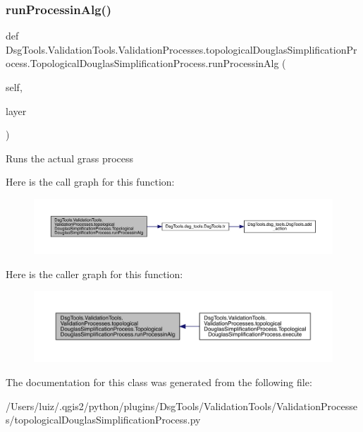 \subsubsection{\texorpdfstring{run\+Processin\+Alg()}{runProcessinAlg()}}
{\footnotesize\ttfamily def Dsg\+Tools.\+Validation\+Tools.\+Validation\+Processes.\+topological\+Douglas\+Simplification\+Process.\+Topological\+Douglas\+Simplification\+Process.\+run\+Processin\+Alg (\begin{DoxyParamCaption}\item[{}]{self,  }\item[{}]{layer }\end{DoxyParamCaption})}

\begin{DoxyVerb}Runs the actual grass process
\end{DoxyVerb}
 Here is the call graph for this function\+:
\nopagebreak
\begin{figure}[H]
\begin{center}
\leavevmode
\includegraphics[width=350pt]{class_dsg_tools_1_1_validation_tools_1_1_validation_processes_1_1topological_douglas_simplificat7eb46ba2812d315c08230afeb95e4b17_af32407c7dd723c00d3c41eac869576c4_cgraph}
\end{center}
\end{figure}
Here is the caller graph for this function\+:
\nopagebreak
\begin{figure}[H]
\begin{center}
\leavevmode
\includegraphics[width=350pt]{class_dsg_tools_1_1_validation_tools_1_1_validation_processes_1_1topological_douglas_simplificat7eb46ba2812d315c08230afeb95e4b17_af32407c7dd723c00d3c41eac869576c4_icgraph}
\end{center}
\end{figure}


The documentation for this class was generated from the following file\+:\begin{DoxyCompactItemize}
\item 
/\+Users/luiz/.\+qgis2/python/plugins/\+Dsg\+Tools/\+Validation\+Tools/\+Validation\+Processes/topological\+Douglas\+Simplification\+Process.\+py\end{DoxyCompactItemize}
